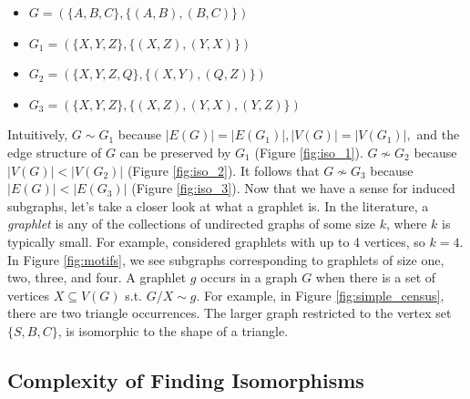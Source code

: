 \documentclass[12pt,twoside]{reedthesis}
\begin{document}
\begin{itemize}
		\item $G = (\{A,B,C\}, \{(A,B), (B,C)\})$
		\item $G_{1} = (\{X,Y,Z\}, \{(X,Z), (Y,X)\})$
		\item $G_{2} = (\{X,Y,Z,Q\}, \{(X,Y), (Q,Z)\})$
		\item $G_{3} = (\{X,Y,Z\}, \{(X,Z), (Y,X), (Y,Z)\})$
\end{itemize}

Intuitively, $G \sim G_{1}$ because $|E(G)| = |E(G_{1})|, |V(G)| = |V(G_{1})|,$ and the edge structure of $G$ can be preserved by $G_{1}$ (Figure \ref{fig:iso_1}). $G \nsim G_{2}$ because $|V(G)| < |V(G_{2})|$ (Figure \ref{fig:iso_2}). It follows that $G \nsim G_{3}$ because $|E(G)| < |E(G_{3})|$ (Figure \ref{fig:iso_3}). Now that we have a sense for induced subgraphs, let's take a closer look at what a graphlet is. In the literature, a \textit{graphlet} is any of the collections of undirected graphs of some size $k$, where $k$ is typically small. For example, \citeauthor{g_tries} \cite{g_tries} considered graphlets with up to 4 vertices, so $k = 4$. In Figure \ref{fig:motifs}, we see subgraphs corresponding to graphlets of size one, two, three, and four. A graphlet $g$ occurs in a graph $G$ when there is a set of vertices $X \subseteq V(G)$ s.t.  $G/X \sim g$. For example, in Figure \ref{fig:simple_census}, there are two triangle occurrences. The larger graph restricted to the vertex set $\{S,B,C\}$, is isomorphic to the shape of a triangle.


\subsection{Complexity of Finding Isomorphisms}
\end{document}
